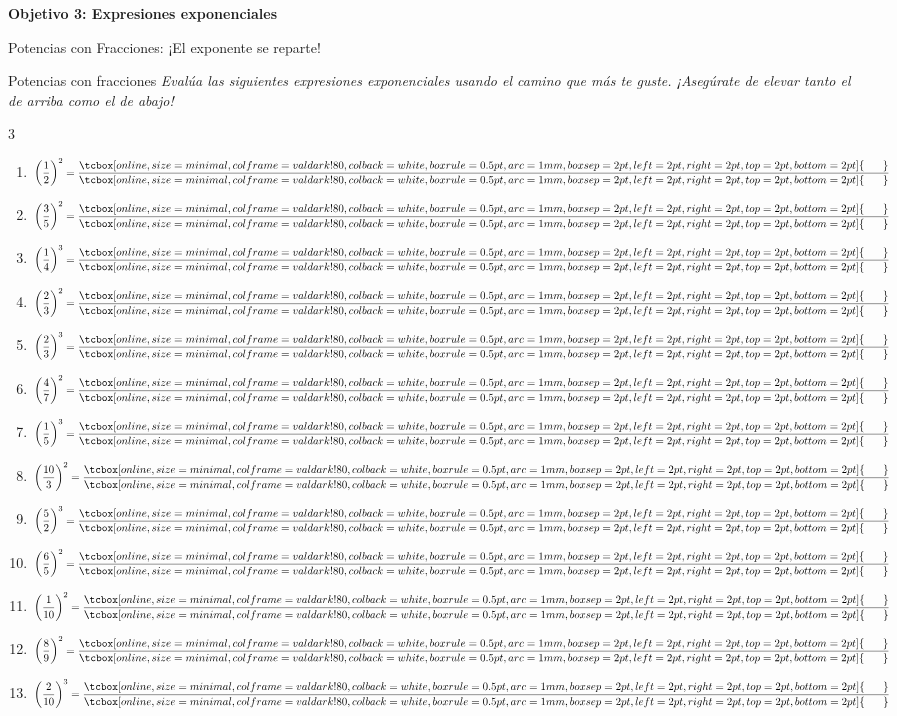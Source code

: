\documentclass[12pt, letterpaper]{article}
\newenvironment{objetivo}[1]{%
    \begin{tcolorbox}[colback=valblue!10, colframe=valblue, arc=2mm, boxrule=1.5pt]
        {\large\bfseries \ding{118} #1}
    \end{tcolorbox}
}{}
\newcommand{\boxfill}[1][0.8cm]{\tcbox[on line, size=minimal, colframe=valdark!80, colback=white, boxrule=0.5pt, arc=1mm, boxsep=2pt, left=2pt, right=2pt, top=2pt, bottom=2pt]{\makebox[#1]{\vphantom{M}}}}
\begin{document}
\begin{objetivo}{Objetivo 3: Expresiones exponenciales}
\begin{concepto}{Potencias con Fracciones: ¡El exponente se reparte!}
    \end{concepto}
    
    \begin{practica}{Potencias con fracciones}
        \textit{Evalúa las siguientes expresiones exponenciales usando el camino que más te guste. ¡Asegúrate de elevar tanto el de arriba como el de abajo!}
        
        \vspace{0.2cm}
        \begin{multicols}{3}
            \raggedcolumns
            \begin{enumerate}[itemsep=0.6cm]
                \item $\left(\dfrac{1}{2}\right)^2 = \dfrac{\boxfill[0.6cm]}{\boxfill[0.6cm]}$
                \item $\left(\dfrac{3}{5}\right)^2 = \dfrac{\boxfill[0.6cm]}{\boxfill[0.6cm]}$
                \item $\left(\dfrac{1}{4}\right)^3 = \dfrac{\boxfill[0.6cm]}{\boxfill[0.6cm]}$
                \item $\left(\dfrac{2}{3}\right)^2 = \dfrac{\boxfill[0.6cm]}{\boxfill[0.6cm]}$
                \item $\left(\dfrac{2}{3}\right)^3 = \dfrac{\boxfill[0.6cm]}{\boxfill[0.6cm]}$
                \item $\left(\dfrac{4}{7}\right)^2 = \dfrac{\boxfill[0.6cm]}{\boxfill[0.6cm]}$
                \item $\left(\dfrac{1}{5}\right)^3 = \dfrac{\boxfill[0.6cm]}{\boxfill[0.6cm]}$
                \item $\left(\dfrac{10}{3}\right)^2 = \dfrac{\boxfill[0.6cm]}{\boxfill[0.6cm]}$
                \item $\left(\dfrac{5}{2}\right)^3 = \dfrac{\boxfill[0.6cm]}{\boxfill[0.6cm]}$
                \item $\left(\dfrac{6}{5}\right)^2 = \dfrac{\boxfill[0.6cm]}{\boxfill[0.6cm]}$
                \item $\left(\dfrac{1}{10}\right)^2 = \dfrac{\boxfill[0.6cm]}{\boxfill[0.6cm]}$
                \item $\left(\dfrac{8}{9}\right)^2 = \dfrac{\boxfill[0.6cm]}{\boxfill[0.6cm]}$
                \item $\left(\dfrac{2}{10}\right)^3 = \dfrac{\boxfill[0.6cm]}{\boxfill[0.6cm]}$

\end{enumerate}
\end{multicols}
\end{practica}
\end{objetivo}
\end{document}
